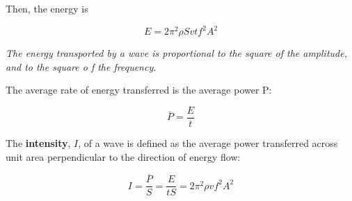 \documentclass[]{beamer}
\begin{document}

\begin{frame}
Then, the energy is

\begin{equation}
E=2\pi^2\rho S v t f^2A^2
\end{equation}

\textit{The energy transported by a
wave is proportional to the square of the amplitude, and to the square o f the
frequency}.
\vspace{2mm}

\pause

The average rate of energy transferred is the average power P:

\pause

\begin{equation}
\overline P=\frac{E}{t}
\end{equation}


\end{frame}



\begin{frame}


The \textbf{ intensity}, $I$, of a wave is defined as the average power transferred
across unit area perpendicular to the direction of energy flow:

\pause

\begin{equation}
I= \frac{\overline P}{S}=\frac{E}{tS}=2\pi^2\rho  v f^2A^2
\end{equation}
\end{frame}
\end{document}
